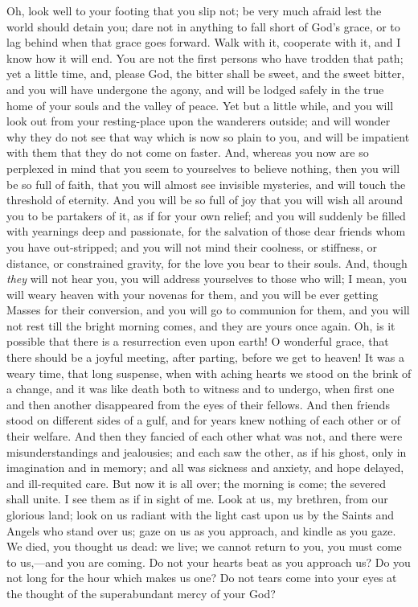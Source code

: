 Oh, look well to your footing that you slip not; be very much
afraid lest the world should detain you; dare not in anything to fall
short of God's grace, or to lag behind when that grace goes forward.
Walk with it, cooperate with it, and I know how it will end. You are
not the first persons who have trodden that path; yet a little time,
and, please God, the bitter shall be sweet, and the sweet bitter, and
you will have undergone the agony, and will be lodged safely in the
true home of your souls and the valley of peace. Yet but a little
while, and you will look out from your resting-place upon the
wanderers outside; and will wonder why they do not see that way which
is now so plain to you, and will be impatient with them that they do
not come on faster. And, whereas you now are so perplexed in mind that
you seem to yourselves to believe nothing, then you will be so full of
faith, that you will almost see invisible mysteries, and will touch
the threshold of eternity. And you will be so full of joy that you
will wish all around you to be partakers of it, as if for your own
relief; and you will suddenly be filled with yearnings deep and
passionate, for the salvation of those dear friends whom you have
out-stripped; and you will not mind their coolness, or stiffness, or
distance, or constrained gravity, for the love you bear to their
souls. And, though \emph{they} will not hear you, you will address
yourselves to those who will; I mean, you will weary heaven with your
novenas for them, and you will be ever getting Masses for their
conversion, and you will go to communion for them, and you will not
rest till the bright morning comes, and they are yours once again. Oh,
is it possible that there is a resurrection even upon earth! O
wonderful grace, that there should be a joyful meeting, after parting,
before we get to heaven! It was a weary time, that long suspense, when
with aching hearts we stood on the brink of a change, and it was like
death both to witness and to undergo, when first one and then another
disappeared from the eyes of their fellows. And then friends stood on
different sides of a gulf, and for years knew nothing of each other or
of their welfare. And then they fancied of each other what was not,
and there were misunderstandings and jealousies; and each saw the
other, as if his ghost, only in imagination and in memory; and all was
sickness and anxiety, and hope delayed, and ill-requited care. But now
it is all over; the morning is come; the severed shall unite. I see
them as if in sight of me. Look at us, my brethren, from our glorious
land; look on us radiant with the light cast upon us by the Saints and
Angels who stand over us; gaze on us as you approach, and kindle as
you gaze. We died, you thought us dead: we live; we cannot return to
you, you must come to us,—and you are coming. Do not your hearts
beat as you approach us? Do you not long for the hour which makes us
one? Do not tears come into your eyes at the thought of the
superabundant mercy of your God?

